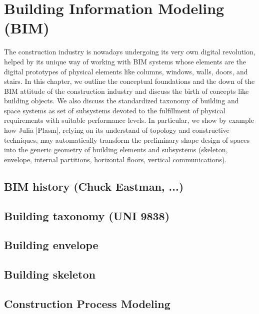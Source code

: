 
\chapter{Building Information Modeling (BIM)}
\label{chapt:9}

The construction industry is nowadays undergoing its very own digital revolution, helped by its unique way of working with BIM systems whose elements are the digital prototypes of physical elements like columns, windows, walls, doors, and stairs. 
In this chapter, we outline the conceptual foundations and the down of the BIM attitude of the construction industry and discuss the birth of concepts like building objects. We also discuss the standardized taxonomy of building and space systems as set of subsystems devoted to the fulfillment of physical requirements with suitable performance levels. 
In particular, we show  by example how Julia |Plasm|, relying on its understand of topology and constructive techniques, may automatically transform the preliminary shape design of spaces into the generic geometry of building elements and subsystems (skeleton, envelope, internal partitions, horizontal floors, vertical communications).


\section{BIM history (Chuck Eastman, ...)}\label{sect:9-1}


\section{Building taxonomy (UNI 9838)}\label{sect:9-2}


\section{Building envelope}\label{sect:9-3}


\section{Building skeleton}\label{sect:9-4}


\section{Construction Process Modeling}\label{sect:9-5}


